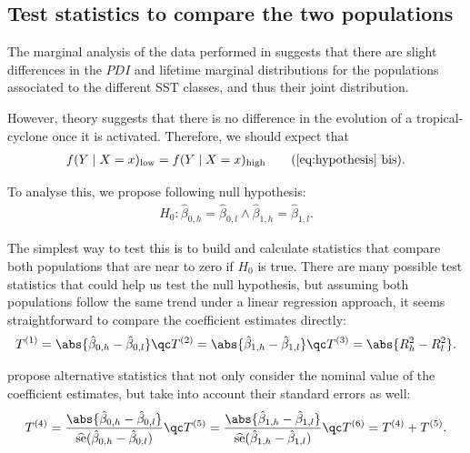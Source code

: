 \subsection{Test statistics to compare the two populations}\label{sec:statistics-intro}
The marginal analysis of the data performed in  suggests that there are slight differences in the $PDI$ and lifetime marginal distributions for the populations associated to the different SST classes, and thus their joint distribution.

However, theory suggests that there is no difference in the evolution of a tropical-cyclone once it is activated. Therefore, we should expect that
\begin{align}
	f(Y \mid X = x)_{\text{low}} = f(Y \mid X = x)_{\text{high}}
	\tag{\ref{eq:hypothesis} bis}
	.
\end{align}

To analyse this, we propose following null hypothesis:
\begin{align}
	H_{0} : \hat{\beta}_{0,h} = \hat{\beta}_{0,l} \wedge \hat{\beta}_{1,h} = \hat{\beta}_{1,l}
	.
\end{align}

The simplest way to test this is to build and calculate statistics that compare both populations that are near to zero if $H_{0}$ is true. There are many possible test statistics that could help us test the null hypothesis, but assuming both populations follow the same trend under a linear regression approach, it seems straightforward to compare the coefficient estimates directly:
\begin{align}
	T^{(1)} = \abs{\hat{\beta}_{0,h} - \hat{\beta}_{0,l}}
	\qc
	T^{(2)} = \abs{\hat{\beta}_{1,h} - \hat{\beta}_{1,l}}
	\qc
	T^{(3)} = \abs{ R^{2}_{h} - R^{2}_{l} } \label{eq:h0-stat-simple} .
\end{align}

\textcite{Polko-Zajac2016} propose alternative statistics that not only consider the nominal value of the coefficient estimates, but take into account their standard errors as well:
\begin{align}
	T^{(4)} = \frac{\abs{\hat{\beta}_{0,h} - \hat{\beta}_{0,l}}}{\se{\hat{\beta}_{0,h} - \hat{\beta}_{0,l}}}
	\qc
	T^{(5)} = \frac{\abs{\hat{\beta}_{1,h} - \hat{\beta}_{1,l}}}{\se{\hat{\beta}_{1,h} - \hat{\beta}_{1,l}}}
	\qc
	T^{(6)} = T^{(4)} + T^{(5)} \label{eq:h0-stat-polko} .
\end{align}

